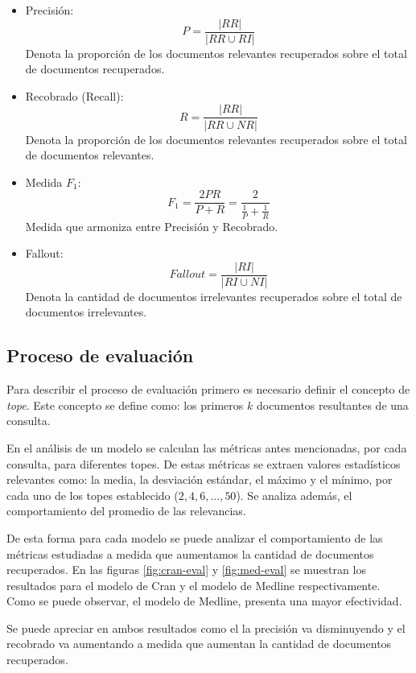 \begin{itemize}
\item Precisión:
    $$P = \dfrac{|RR|}{|RR \cup RI|}$$
    Denota la proporción de los documentos relevantes recuperados sobre
	el total de documentos recuperados.\\
\item Recobrado (Recall):
    $$R = \dfrac{|RR|}{|RR \cup NR|}$$
	Denota la proporción de los documentos relevantes recuperados sobre
	el total de documentos relevantes.\\
\item Medida $F_1$:
    $$F_1 = \dfrac{2PR}{P+R} = \dfrac{2}{\frac{1}{P} + \frac{1}{R}}$$
    Medida que armoniza entre Precisión y Recobrado.\\
\item Fallout:
	$$Fallout = \dfrac{|RI|}{|RI\cup NI|}$$
     Denota la cantidad de documentos irrelevantes recuperados sobre el total de
	 documentos irrelevantes.
\end{itemize}

\subsection{Proceso de evaluación}\label{sec:evaluation}

Para describir el proceso de evaluación primero es necesario definir el concepto
de \emph{tope}. Este concepto se define como: los primeros $k$ documentos
resultantes de una consulta.

En el análisis de un modelo se calculan las métricas antes mencionadas, por
cada consulta, para diferentes topes. De estas métricas se extraen valores
estadísticos relevantes como: la media, la desviación estándar, el máximo y
el mínimo, por cada uno de los topes establecido ($2, 4, 6, ..., 50$). Se
analiza además, el comportamiento del promedio de las relevancias.

De esta forma para cada modelo se puede analizar el comportamiento de las métricas
estudiadas a medida que aumentamos la cantidad de documentos recuperados. En las
figuras \ref{fig:cran-eval} y \ref{fig:med-eval} se muestran los resultados
para el modelo de Cran y el modelo de Medline respectivamente. Como se puede
observar, el modelo de Medline, presenta una mayor efectividad.

Se puede apreciar en ambos resultados como el la precisión va disminuyendo y 
el recobrado va aumentando a medida que aumentan la cantidad de documentos
recuperados.

